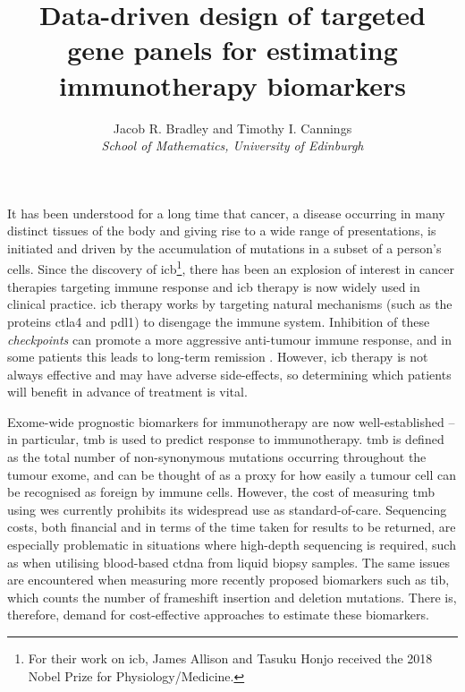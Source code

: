 \documentclass[12pt]{article}
\title{Data-driven design of targeted gene panels for estimating immunotherapy biomarkers}
\author{Jacob R. Bradley and Timothy I. Cannings
 \\ \emph{School of Mathematics, University of Edinburgh}}
\date{}
\begin{document}
\maketitle




It has been understood for a long time that cancer, a disease occurring in many distinct tissues of the body and giving rise to a wide range of presentations, is initiated and driven by the accumulation of mutations in a subset of a person's cells. Since the discovery of \gls{icb}\footnote{For their work on \gls{icb}, James Allison and Tasuku Honjo received the 2018 Nobel Prize for Physiology/Medicine.},  there has been an explosion of interest in cancer therapies targeting immune response and \gls{icb} therapy is now widely used in clinical practice.  \gls{icb} therapy works by targeting natural mechanisms (such as the proteins \gls{ctla4} and \gls{pdl1}) to disengage the immune system. Inhibition of these \emph{checkpoints} can promote a more aggressive anti-tumour immune response, and in some patients this leads to long-term remission . However, \gls{icb} therapy is not always effective and may have adverse side-effects, so determining which patients will benefit in advance of treatment is vital. 


Exome-wide prognostic biomarkers for immunotherapy are now well-established -- in particular, \gls{tmb} is used to predict response to immunotherapy.  \gls{tmb} is defined as the total number of non-synonymous mutations occurring throughout the tumour exome, and can be thought of as a proxy for how easily a tumour cell can be recognised as foreign by immune cells. However, the cost of measuring \gls{tmb} using \gls{wes} currently prohibits its widespread use as standard-of-care.  Sequencing costs, both financial and in terms of the time taken for results to be returned, are especially problematic in situations where high-depth sequencing is required, such as when utilising blood-based \gls{ctdna} from liquid biopsy samples. The same issues are encountered when measuring more recently proposed biomarkers such as \gls{tib}, which counts the number of frameshift insertion and deletion mutations. There is, therefore, demand for cost-effective approaches to estimate these biomarkers.
\end{document}
